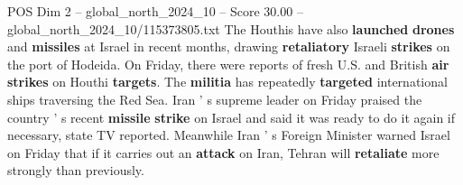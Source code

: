 \begin{textsample}{POS Dim 2 – global\_north\_2024\_10 – Score 30.00 – global\_north\_2024\_10/115373805.txt}
The Houthis have also \textbf{launched} \textbf{drones} and \textbf{missiles} at Israel in recent months, drawing \textbf{retaliatory} Israeli \textbf{strikes} on the port of Hodeida.
On Friday, there were reports of fresh U.S. and British \textbf{air} \textbf{strikes} on Houthi \textbf{targets}.
The \textbf{militia} has repeatedly \textbf{targeted} international ships traversing the Red Sea.
Iran ' s supreme leader on Friday praised the country ' s recent \textbf{missile} \textbf{strike} on Israel and said it was ready to do it again if necessary, state TV reported.
Meanwhile Iran ' s Foreign Minister warned Israel on Friday that if it carries out an \textbf{attack} on Iran, Tehran will \textbf{retaliate} more strongly than previously.

\end{textsample}
